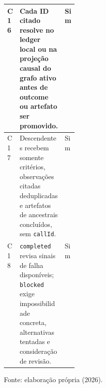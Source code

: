 \begin{table}[H]
\begin{tabularx}{\linewidth}{|p{0.07\linewidth}|Y|p{0.10\linewidth}|}
\hline
C16 & Cada ID citado resolve no ledger local ou na projeção causal do grafo ativo antes de outcome ou artefato ser promovido. & Sim \\
\hline
C17 & Descendentes recebem somente critérios, observações citadas deduplicadas e artefatos de ancestrais concluídos, sem \texttt{callId}. & Sim \\
\hline
C18 & \texttt{completed} revisa sinais de falha disponíveis; \texttt{blocked} exige impossibilidade concreta, alternativas tentadas e consideração de revisão. & Sim \\
\hline
\end{tabularx}
\par\smallskip\raggedright\small Fonte: elaboração própria (2026).
\end{table}
